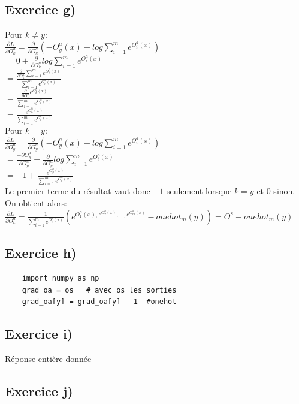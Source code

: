 \documentclass[a4paper,10pt]{article}
\begin{document}
\subsection{Exercice g)}
Pour $k \neq y$:
\\[6pt]
$\frac{\partial L}{\partial {O^a_k}} = \frac{\partial}{\partial O^a_k} ( -O^a_y (x)+ log \sum_{i=1}^{m} e^{O^a_i(x)})$
\\[6pt]
$= 0 + \frac{\partial}{\partial O^a_k} log \sum_{i=1}^{m} e^{O^a_i(x)}$
\\[6pt]
$= \frac{\frac{\partial}{\partial O^a_k} \sum_{i=1}^{m} e^{O^a_i(x)}}{\sum_{i=1}^{m} e^{O^a_i(x)}}$
\\[6pt]
$= \frac{\frac{\partial}{\partial O^a_k} e^{O^a_k(x)}}{\sum_{i=1}^{m} e^{O^a_i(x)}}$
\\[6pt]
$= \frac{e^{O^a_k(x)}}{\sum_{i=1}^{m} e^{O^a_i(x)}}$
\\[10pt]
Pour $k=y$:
\\[6pt]
$\frac{\partial L}{\partial {O^a_y}} = \frac{\partial}{\partial O^a_y} ( -O^a_y (x)+ log \sum_{i=1}^{m} e^{O^a_i(x)})$
\\[6pt]
$= \frac{-\partial O^a_y}{\partial O^a_y} + \frac{\partial}{\partial O^a_y} log \sum_{i=1}^{m} e^{O^a_i(x)}$
\\[6pt]
$= -1+\frac{e^{O^a_y(x)}}{\sum_{i=1}^{m} e^{O^a_i(x)}}$
\\[6pt]
Le premier terme du résultat vaut donc $-1$ seulement lorsque $k=y$ et 0 sinon. On obtient alors:
\\[6pt]
$\frac{\partial L}{\partial {O^a_k}} = \frac{1}{\sum_{i=1}^{m} e^{O^a_i(x)}} (e^{O^a_1(x), e^{O^a_2(x)}, ..., e^{O^a_m(x)}}- onehot_m(y)) = O^s - onehot_m(y)$

\subsection{Exercice h)}


\begin{verbatim}
	import numpy as np
	grad_oa = os   # avec os les sorties
	grad_oa[y] = grad_oa[y] - 1  #onehot
\end{verbatim}

\subsection{Exercice i)}
Réponse entière donnée

\subsection{Exercice j)} 
\end{document}
